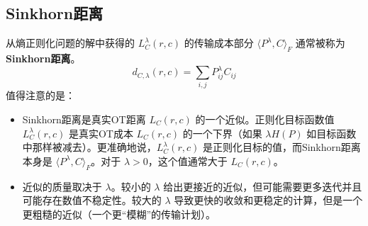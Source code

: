 \documentclass[lang=cn,newtx,10pt,scheme=chinese,chinesefont=nofont,citestyle=gb7714-2015, bibstyle=gb7714-2015]{elegantbook}
\begin{document}
\begin{refsection}

\subsection{Sinkhorn距离}

从熵正则化问题的解中获得的 $L_C^\lambda(r,c)$ 的传输成本部分 $\langle P^\lambda, C \rangle_F$ 通常被称为\textbf{Sinkhorn距离}。
$$ d_{C,\lambda}(r,c) = \sum_{i,j} P^\lambda_{ij} C_{ij} $$
值得注意的是：
\begin{itemize}
    \item Sinkhorn距离是真实OT距离 $L_C(r,c)$ 的一个近似。正则化目标函数值 $L_C^\lambda(r,c)$ 是真实OT成本 $L_C(r,c)$ 的一个下界（如果 $\lambda H(P)$ 如目标函数中那样被减去）。更准确地说，$L_C^\lambda(r,c)$ 是正则化目标的值，而Sinkhorn距离本身是 $\langle P^\lambda, C \rangle_F$。对于 $\lambda > 0$，这个值通常大于 $L_C(r,c)$。
    \item 近似的质量取决于 $\lambda$。较小的 $\lambda$ 给出更接近的近似，但可能需要更多迭代并且可能存在数值不稳定性。较大的 $\lambda$ 导致更快的收敛和更稳定的计算，但是一个更粗糙的近似（一个更“模糊”的传输计划）。
\end{itemize}





\end{refsection}
\end{document}
